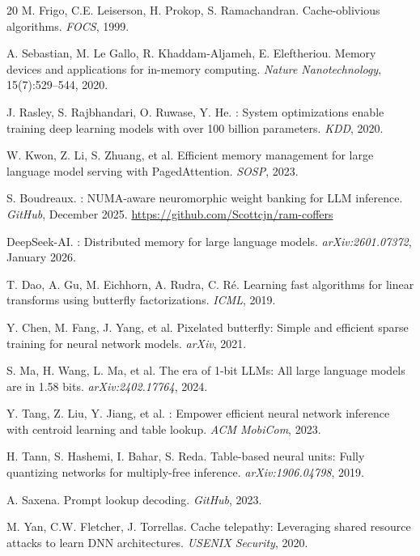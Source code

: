 \documentclass[10pt,twocolumn]{article}
\begin{document}
\begin{thebibliography}{20}
M. Frigo, C.E. Leiserson, H. Prokop, S. Ramachandran.
\newblock Cache-oblivious algorithms.
\newblock \emph{FOCS}, 1999.

A. Sebastian, M. Le Gallo, R. Khaddam-Aljameh, E. Eleftheriou.
\newblock Memory devices and applications for in-memory computing.
\newblock \emph{Nature Nanotechnology}, 15(7):529--544, 2020.

J. Rasley, S. Rajbhandari, O. Ruwase, Y. He.
: System optimizations enable training deep learning models with over 100 billion parameters.
\newblock \emph{KDD}, 2020.

W. Kwon, Z. Li, S. Zhuang, et al.
\newblock Efficient memory management for large language model serving with {PagedAttention}.
\newblock \emph{SOSP}, 2023.

S. Boudreaux.
: {NUMA}-aware neuromorphic weight banking for {LLM} inference.
\newblock \emph{GitHub}, December 2025.
\newblock \url{https://github.com/Scottcjn/ram-coffers}

DeepSeek-AI.
: Distributed memory for large language models.
\newblock \emph{arXiv:2601.07372}, January 2026.

T. Dao, A. Gu, M. Eichhorn, A. Rudra, C. R\'{e}.
\newblock Learning fast algorithms for linear transforms using butterfly factorizations.
\newblock \emph{ICML}, 2019.

Y. Chen, M. Fang, J. Yang, et al.
\newblock Pixelated butterfly: Simple and efficient sparse training for neural network models.
\newblock \emph{arXiv}, 2021.

S. Ma, H. Wang, L. Ma, et al.
\newblock The era of 1-bit {LLMs}: All large language models are in 1.58 bits.
\newblock \emph{arXiv:2402.17764}, 2024.

Y. Tang, Z. Liu, Y. Jiang, et al.
: Empower efficient neural network inference with centroid learning and table lookup.
\newblock \emph{ACM MobiCom}, 2023.

H. Tann, S. Hashemi, I. Bahar, S. Reda.
\newblock Table-based neural units: Fully quantizing networks for multiply-free inference.
\newblock \emph{arXiv:1906.04798}, 2019.

A. Saxena.
\newblock Prompt lookup decoding.
\newblock \emph{GitHub}, 2023.

M. Yan, C.W. Fletcher, J. Torrellas.
\newblock Cache telepathy: Leveraging shared resource attacks to learn {DNN} architectures.
\newblock \emph{USENIX Security}, 2020.

\end{thebibliography}
\end{document}
